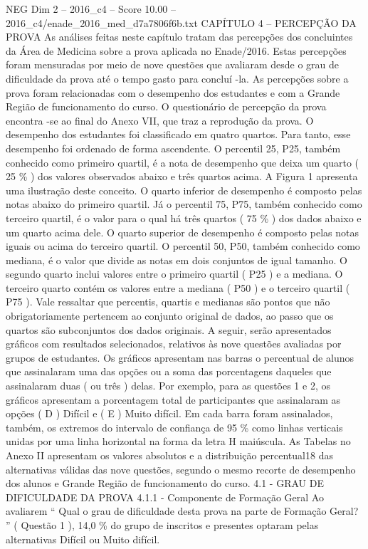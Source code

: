 \begin{textsample}{NEG Dim 2 – 2016\_c4 – Score 10.00 – 2016\_c4/enade\_2016\_med\_d7a7806f6b.txt}  \label{ex:f2_neg_358}
CAPÍTULO 4 – PERCEPÇÃO DA PROVA As análises feitas neste capítulo tratam das percepções dos concluintes da Área de Medicina sobre a prova aplicada no Enade/2016.
Estas percepções foram mensuradas por meio de nove questões que avaliaram desde o grau de dificuldade da prova até o tempo gasto para concluí -la.
As percepções sobre a prova foram relacionadas com o desempenho dos estudantes e com a Grande Região de funcionamento do curso.
O questionário de percepção da prova encontra -se ao final do Anexo VII, que traz a reprodução da prova.
O desempenho dos estudantes foi classificado em quatro quartos.
Para tanto, esse desempenho foi ordenado de forma ascendente.
O percentil 25, P25, também conhecido como primeiro quartil, é a nota de desempenho que deixa um quarto ( 25 \% ) dos valores observados abaixo e três quartos acima.
A Figura 1 apresenta uma ilustração deste conceito.
O quarto inferior de desempenho é composto pelas notas abaixo do primeiro quartil.
Já o percentil 75, P75, também conhecido como terceiro quartil, é o valor para o qual há três quartos ( 75 \% ) dos dados abaixo e um quarto acima dele.
O quarto superior de desempenho é composto pelas notas iguais ou acima do terceiro quartil.
O percentil 50, P50, também conhecido como mediana, é o valor que divide as notas em dois conjuntos de igual tamanho.
O segundo quarto inclui valores entre o primeiro quartil ( P25 ) e a mediana.
O terceiro quarto contém os valores entre a mediana ( P50 ) e o terceiro quartil ( P75 ).
Vale ressaltar que percentis, quartis e medianas são pontos que não obrigatoriamente pertencem ao conjunto original de dados, ao passo que os quartos são subconjuntos dos dados originais.
A seguir, serão apresentados gráficos com resultados selecionados, relativos às nove questões avaliadas por grupos de estudantes.
Os gráficos apresentam nas barras o percentual de alunos que assinalaram uma das opções ou a soma das porcentagens daqueles que assinalaram duas ( ou três ) delas.
Por exemplo, para as questões 1 e 2, os gráficos apresentam a porcentagem total de participantes que assinalaram as opções ( D ) Difícil e ( E ) Muito difícil.
Em cada barra foram assinalados, também, os extremos do intervalo de confiança de 95 \% como linhas verticais unidas por uma linha horizontal na forma da letra H maiúscula.
As Tabelas no Anexo II apresentam os valores absolutos e a distribuição percentual18 das alternativas válidas das nove questões, segundo o mesmo recorte de desempenho dos alunos e Grande Região de funcionamento do curso. 4.1 - GRAU DE DIFICULDADE DA PROVA 4.1.1 - Componente de Formação Geral Ao avaliarem “ Qual o grau de dificuldade desta prova na parte de Formação Geral? ” ( Questão 1 ), 14,0 \% do grupo de inscritos e presentes optaram pelas alternativas Difícil ou Muito difícil.

\end{textsample}
